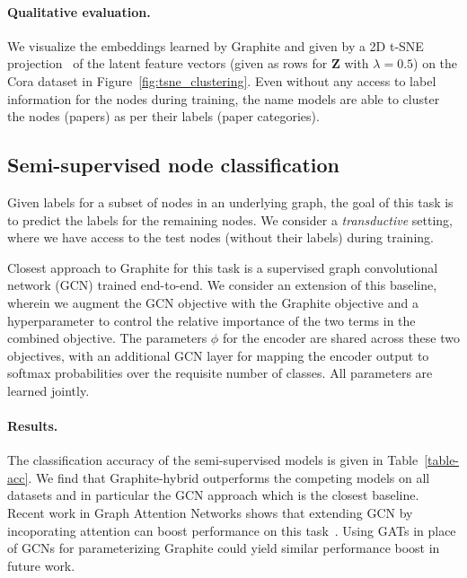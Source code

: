 \documentclass{article}
\newcommand{\name}{Graphite}
\begin{document}
\paragraph{Qualitative evaluation.} We  visualize the embeddings learned by \name{} and given by a 2D t-SNE projection~\citep{maaten2008visualizing} of the latent feature vectors (given as rows for $\mathbf{Z}$ with $\lambda=0.5$) on the Cora dataset in Figure~\ref{fig:tsne_clustering}. Even without any access to label information for the nodes during training, the name{} models are able to cluster the nodes (papers) as per their labels (paper categories).



\subsection{Semi-supervised node classification}


Given labels for a subset of nodes in an underlying graph, the goal of this task is to predict the labels for the remaining nodes. We consider a \textit{transductive} setting, where we have access to the test nodes (without their labels) during training.  

Closest approach to \name{} for this task is a supervised graph convolutional network (GCN) trained end-to-end. We consider an extension of this baseline, wherein we augment the GCN objective with the \name{} objective and a hyperparameter to control the relative importance of the two terms in the combined objective. The parameters $\phi$ for the encoder are shared across these two objectives, with an additional GCN layer for mapping the encoder output to softmax probabilities over the requisite number of classes. All parameters are learned jointly.

\paragraph{Results.} The classification accuracy of the semi-supervised models is given in Table~\ref{table-acc}. We find that \name{}-hybrid outperforms the competing models on all datasets and in particular the GCN approach which is the closest baseline. Recent work in Graph Attention Networks shows that extending GCN by incoporating attention can boost performance on this task~\citep{velickovic2018graph}. 
Using GATs in place of GCNs for parameterizing \name{} could yield similar performance boost in future work.
\end{document}
